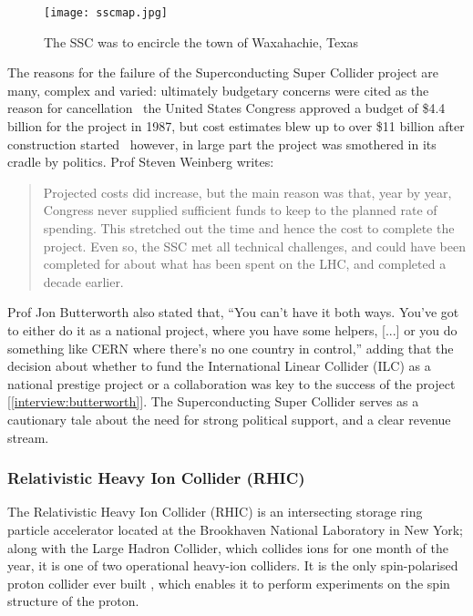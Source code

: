 \begin{figure}[!htb]
\centering
\texttt{[image: sscmap.jpg]}
\caption{The SSC was to encircle the town of Waxahachie, Texas \cite{SSC:SI:Online}}
\end{figure}

The reasons for the failure of the Superconducting Super Collider project are many, complex and varied: ultimately budgetary concerns were cited as the reason for cancellation \textemdash \, the United States Congress approved a budget of \$4.4 billion \cite{SSC:BE} for the project in 1987, but cost estimates blew up to over \$11 billion \cite{SSC:LAT:Online} after construction started \textemdash \, however, in large part the project was smothered in its cradle by politics. Prof Steven Weinberg writes:

\begin{quote}
Projected costs did increase, but the main reason was that, year by year, Congress never supplied sufficient funds to keep to the planned rate of spending. This stretched out the time and hence the cost to complete the project. Even so, the SSC met all technical challenges, and could have been completed for about what has been spent on the LHC, and completed a decade earlier. \cite{SSC:Weinberg:Online}
\end{quote}

Prof Jon Butterworth also stated that, ``You can't have it both ways. You've got to either do it as a national project, where you have some helpers, [...] or you do something like CERN where there's no one country in control,'' adding that the decision about whether to fund the International Linear Collider (ILC) as a national prestige project or a collaboration was key to the success of the project [\ref{interview:butterworth}]. The Superconducting Super Collider serves as a cautionary tale about the need for strong political support, and a clear revenue stream.

\subsubsection{Relativistic Heavy Ion Collider (RHIC)}
The Relativistic Heavy Ion Collider (RHIC) is an intersecting storage ring particle accelerator located at the Brookhaven National Laboratory in New York; along with the Large Hadron Collider, which collides ions for one month of the year, it is one of two operational heavy-ion colliders. It is the only spin-polarised proton collider ever built \cite{RHIC:Spin}, which enables it to perform experiments on the spin structure of the proton.

